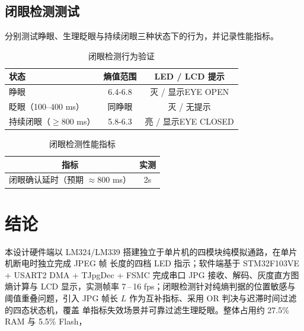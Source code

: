 \documentclass[a4paper]{article}
\begin{document}
\subsection{闭眼检测测试}

分别测试睁眼、生理眨眼与持续闭眼三种状态下的行为，并记录性能指标。

\begin{table}[H]
\centering
\caption{闭眼检测行为验证}
\begin{tabular}{lcc}
\toprule
状态  & 熵值范围 & LED / LCD 提示 \\
\midrule
睁眼 &  6.4-6.8& 灭 / 显示EYE OPEN \\
眨眼（100--400 ms） &同睁眼 & 灭 / 无提示 \\
持续闭眼（$\ge 800$ ms）&  5.8-6.3& 亮 /  显示EYE CLOSED  \\
\bottomrule
\end{tabular}
\end{table}

\begin{table}[H]
\centering
\caption{闭眼检测性能指标}
\begin{tabular}{cc}
\toprule
指标 & 实测 \\
\midrule
闭眼确认延时（预期 $\approx 800$ ms） & 2s \\
\bottomrule
\end{tabular}
\end{table}

\section{结论}

本设计硬件端以 LM324/LM339
搭建独立于单片机的四模块纯模拟通路，在单片机断电时独立完成 JPEG 帧
长度的四档 LED 指示；软件端基于 STM32F103VE + USART2 DMA + TJpgDec +
FSMC 完成串口 JPG 接收、解码、灰度直方图熵计算与 LCD 显示，实测帧率
7\,--\,16 fps；闭眼检测针对纯熵判据的位置敏感与阈值重叠问题，引入 JPG
帧长 $L$ 作为互补指标、采用 OR 判决与迟滞时间过滤的四态状态机，覆盖
单指标失效场景并可靠过滤生理眨眼。整体占用约 27.5\% RAM 与 5.5\% Flash，
\end{document}
